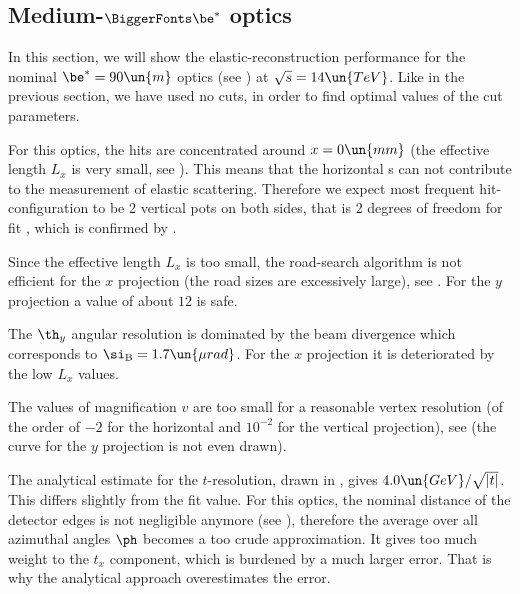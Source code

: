 

\def\OutlineLabel{Medium-beta* optics}
\def\TOCLabel{Medium-$\be^*$ optics}
\subsection[elr 90]{Medium-$\BiggerFonts\mathbf\be^*$ optics}

In this section, we will show the elastic-reconstruction performance for the nominal $\be^* = 90\un{m}$ optics (see ) at $\sqrt s = 14\un{TeV}$. Like in the previous section, we have used no cuts, in order to find optimal values of the cut parameters.

For this optics, the hits are concentrated around $x=0\un{mm}$ (the effective length $L_x$ is very small, see ). This means that the horizontal s can not contribute to the measurement of elastic scattering. Therefore we expect most frequent hit-configuration to be 2 vertical pots on both sides, that is 2 degrees of freedom for fit , which is confirmed by .

Since the effective length $L_x$ is too small, the road-search algorithm is not efficient for the $x$ projection (the road sizes are excessively large), see . For the $y$ projection a value of about $12$ is safe.

\bmfig
{}
\emfig

The $\th_y$ angular resolution is dominated by the beam divergence which corresponds to $\si_{\rm B} = 1.7\un{\mu rad}$. For the $x$ projection it is deteriorated by the low $L_x$ values.

The values of magnification $v$ are too small for a reasonable vertex resolution (of the order of $-2$ for the horizontal and $10^{-2}$ for the vertical projection), see  (the curve for the $y$ projection is not even drawn).

\bmfig
{}
\emfig

The analytical estimate  for the $t$-resolution, drawn in , gives $4.0\un{GeV}/\sqrt{|t|}$. This differs slightly from the fit value. For this optics, the nominal distance of the detector edges is not negligible anymore (see ), therefore the average over all azimuthal angles $\ph$ becomes a too crude approximation. It gives too much weight to the $t_x$ component, which is burdened by a much larger error. That is why the analytical approach overestimates the error.

